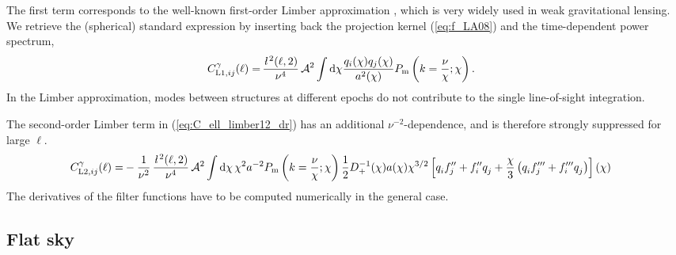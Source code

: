 \documentclass[fleqn,usenatbib]{mnras} %
\newcommand{\ellbar}{\hbox{\it \l}\,}
\newcommand{\pref}{{\cal A}}
\begin{document}
%
The first term corresponds to the well-known first-order Limber approximation
\cite{1953ApJ...117..134L,1992ApJ...388..272K}, which is very widely used in
weak gravitational lensing. We retrieve the (spherical) standard expression by
inserting back the projection kernel (\ref{eq:f_LA08}) and the time-dependent
power spectrum,
%
\begin{align}
  C^\gamma_{{\rm L1}, ij}(\ell) = & \, \frac{\ellbar^2(\ell, 2)}{\nu^4} \, \pref^2 \int {\rm d} \chi \frac{ q_i(\chi) q_j(\chi) }{a^2(\chi)}
  P_{\rm m}\left(k = \frac{\nu}{\chi}; \chi\right).
  \label{eq:C_ell_limber1}
\end{align}
%
In the Limber approximation, modes between structures at different epochs do
not contribute to the single line-of-sight integration.

The second-order Limber term in (\ref{eq:C_ell_limber12_dr}) has an additional
$\nu^{-2}$-dependence, and is therefore strongly suppressed for large $\ell$.
%
\begin{align}
  C^\gamma_{{\rm L2}, ij}(\ell) = & - \frac 1 {\nu^2} \, \frac{\ellbar^2(\ell, 2)}{\nu^4} \, \pref^2
    \int {\rm d} \chi \, \chi^{2} a^{-2} P_{\rm m}\left(k = \frac\nu\chi; \chi\right)
    \frac 1 2 D^{-1}_+(\chi) a(\chi) \chi^{3/2} \left[ q^{}_i f^{\prime\prime}_j + f^{\prime\prime}_i q^{}_j
      + \frac{\chi}{3} \left( q^{}_i f^{\prime\prime\prime}_j + f^{\prime\prime\prime}_i q^{}_j
      \right)
    \right](\chi)
  \label{eq:C_ell_limber2_dr} 
\end{align}
%
The derivatives of the filter functions have to be computed numerically in the general case.


\subsection{Flat sky}
\end{document}
